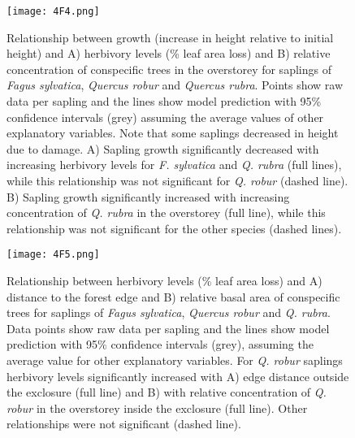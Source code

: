 \documentclass[b5paper,10pt]{book} %
\begin{document}
	\begin{figure}
		\begin{center}
			\texttt{[image: 4F4.png]}
		\end{center}
			\caption{Relationship between growth (increase in height relative to initial height) and A) herbivory levels (\% leaf area loss) and B) relative concentration of conspecific trees in the overstorey for saplings of \textit{Fagus sylvatica}, \textit{Quercus robur} and \textit{Quercus rubra}. Points show raw data per sapling and the lines show model prediction with 95\% confidence intervals (grey) assuming the average values of other explanatory variables. Note that some saplings decreased in height due to damage. A) Sapling growth significantly decreased with increasing herbivory levels for \textit{F. sylvatica} and \textit{Q. rubra} (full lines), while this relationship was not significant for \textit{Q. robur} (dashed line). B) Sapling growth significantly increased with increasing concentration of \textit{Q. rubra} in the overstorey (full line), while this relationship was not significant for the other species (dashed lines). \label{Fig4.4}}
	\end{figure}



	\begin{figure}
		\begin{center}
			\texttt{[image: 4F5.png]}
		\end{center}
			\caption{Relationship between herbivory levels (\% leaf area loss) and A) distance to the forest edge and B) relative basal area of conspecific trees for saplings of \textit{Fagus sylvatica}, \textit{Quercus robur} and \textit{Q. rubra}. Data points show raw data per sapling and the lines show model prediction with 95\% confidence intervals (grey), assuming the average value for other explanatory variables. For \textit{Q. robur} saplings herbivory levels significantly increased with A) edge distance outside the exclosure (full line) and B) with relative concentration of \textit{Q. robur} in the overstorey inside the exclosure (full line). Other relationships were not significant (dashed line).  \label{Fig4.5}}
	\end{figure}
\end{document}
